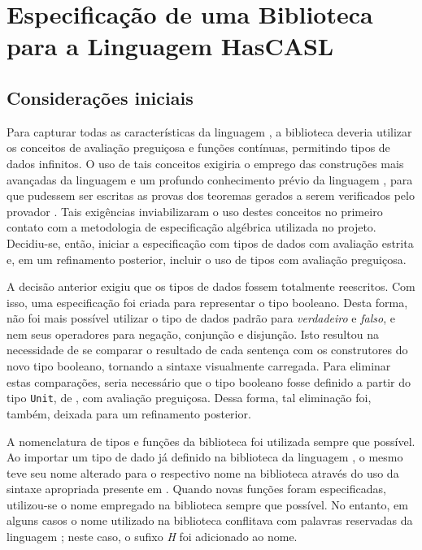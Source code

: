 \chapter{Especificação de uma Biblioteca para a Linguagem HasCASL}
\label{chap:desenvBiblioteca}

\section{Considerações iniciais}

Para capturar todas as características da linguagem \Haskell, a biblioteca deveria utilizar os conceitos de avaliação preguiçosa e funções contínuas, permitindo tipos de dados infinitos.
O uso de tais conceitos exigiria o emprego das construções mais avançadas da linguagem \HasCASL e um profundo conhecimento prévio da linguagem \HOL, para que pudessem ser escritas as provas dos teoremas gerados a serem verificados pelo provador \Isabelle.
Tais exigências inviabilizaram o uso destes conceitos no primeiro contato com a metodologia de especificação algébrica utilizada no projeto.
Decidiu-se, então, iniciar a especificação com tipos de dados com avaliação estrita e, em um refinamento posterior, incluir o uso de tipos com avaliação preguiçosa.

A decisão anterior exigiu que os tipos de dados fossem totalmente reescritos.
Com isso, uma especificação foi criada para representar o tipo booleano.
Desta forma, não foi mais possível utilizar o tipo de dados padrão para \textit{verdadeiro} e \textit{falso}, e nem seus operadores para negação, conjunção e disjunção.
Isto resultou na necessidade de se comparar o resultado de cada sentença com os construtores do novo tipo booleano, tornando a sintaxe visualmente carregada.
Para eliminar estas comparações, seria necessário que o tipo booleano fosse definido a partir do tipo \Verb.Unit., de \CASL, com avaliação preguiçosa.
Dessa forma, tal eliminação foi, também, deixada para um refinamento posterior.

A nomenclatura de tipos e funções da biblioteca \Prelude foi utilizada sempre que possível.
Ao importar um tipo de dado já definido na biblioteca da linguagem \CASL, o mesmo teve seu nome alterado para o respectivo nome na biblioteca \Prelude através do uso da sintaxe apropriada presente em \HasCASL.
Quando novas funções foram especificadas, utilizou-se o nome empregado na biblioteca \Prelude sempre que possível.
No entanto, em alguns casos o nome utilizado na biblioteca \Prelude conflitava com palavras reservadas da linguagem \HasCASL; neste caso, o sufixo \textit{H} foi adicionado ao nome.

